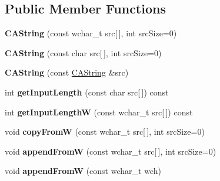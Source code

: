 \subsection*{Public Member Functions}
\begin{DoxyCompactItemize}
\item 
\hypertarget{classps_1_1CAString_afcc77ed90d318aed951fbd2956d04ffd}{}{\bfseries C\+A\+String} (const wchar\+\_\+t src\mbox{[}$\,$\mbox{]}, int src\+Size=0)\label{classps_1_1CAString_afcc77ed90d318aed951fbd2956d04ffd}

\item 
\hypertarget{classps_1_1CAString_ad8b89602cddeee22290d20644568e453}{}{\bfseries C\+A\+String} (const char src\mbox{[}$\,$\mbox{]}, int src\+Size=0)\label{classps_1_1CAString_ad8b89602cddeee22290d20644568e453}

\item 
\hypertarget{classps_1_1CAString_a1daf3874d5d6ff5fe80b3ef0c6c6c153}{}{\bfseries C\+A\+String} (const \hyperlink{classps_1_1CAString}{C\+A\+String} \&src)\label{classps_1_1CAString_a1daf3874d5d6ff5fe80b3ef0c6c6c153}

\item 
\hypertarget{classps_1_1CAString_afd7e30e0b6916282d8b44bff9f04c9a5}{}int {\bfseries get\+Input\+Length} (const char src\mbox{[}$\,$\mbox{]}) const \label{classps_1_1CAString_afd7e30e0b6916282d8b44bff9f04c9a5}

\item 
\hypertarget{classps_1_1CAString_a60b63c63031e38ca52ddb5f79254e13d}{}int {\bfseries get\+Input\+Length\+W} (const wchar\+\_\+t src\mbox{[}$\,$\mbox{]}) const \label{classps_1_1CAString_a60b63c63031e38ca52ddb5f79254e13d}

\item 
\hypertarget{classps_1_1CAString_a90787b59316e2fc9a1aaa866d4473e4d}{}void {\bfseries copy\+From\+W} (const wchar\+\_\+t src\mbox{[}$\,$\mbox{]}, int src\+Size=0)\label{classps_1_1CAString_a90787b59316e2fc9a1aaa866d4473e4d}

\item 
\hypertarget{classps_1_1CAString_ab867abaf43515df9d92bcb8f987e47b4}{}void {\bfseries append\+From\+W} (const wchar\+\_\+t src\mbox{[}$\,$\mbox{]}, int src\+Size=0)\label{classps_1_1CAString_ab867abaf43515df9d92bcb8f987e47b4}

\item 
\hypertarget{classps_1_1CAString_a9a5f1beeda80d4f91da9a309f40a8211}{}void {\bfseries append\+From\+W} (const wchar\+\_\+t wch)\label{classps_1_1CAString_a9a5f1beeda80d4f91da9a309f40a8211}


\end{DoxyCompactItemize}
